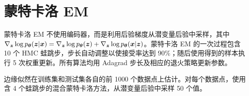 \section{蒙特卡洛 EM}
蒙特卡洛 EM 不使用编码器，而是利用后验梯度从潜变量后验中采样，其中 $\nabla_{\bm{z}}\log p_{\bm{\theta}}(\bm{z}|\bm{x})=\nabla_{\bm{z}}\log p_{\bm{\theta}}(\bm{z})+\nabla_{\bm{z}}\log p_{\bm{\theta}}(\bm{x}|\bm{z})$。蒙特卡洛 EM 的一次过程包含 10 个 HMC 蛙跳步，步长自动调整以使接受率达到 $90\%$；随后使用得到的样本执行 5 次权重更新。所有算法均用 Adagrad 步长及相应的退火策略更新参数。

边缘似然在训练集和测试集各自的前 1000 个数据点上估计。对每个数据点，使用含 4 个蛙跳步的混合蒙特卡洛方法，从潜变量后验中采样 50 个值。

